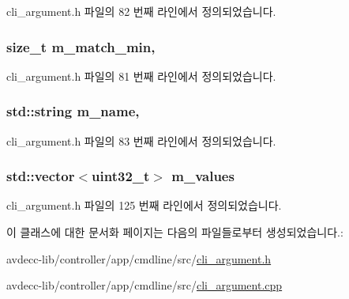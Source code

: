cli\+\_\+argument.\+h 파일의 82 번째 라인에서 정의되었습니다.

\subsubsection[{\texorpdfstring{m\+\_\+match\+\_\+min}{m_match_min}}]{\setlength{\rightskip}{0pt plus 5cm}size\+\_\+t m\+\_\+match\+\_\+min\hspace{0.3cm}{\ttfamily [protected]}, {\ttfamily [inherited]}}\hypertarget{classcli__argument_a9e9208481670105577821d0a1aee5179}{}\label{classcli__argument_a9e9208481670105577821d0a1aee5179}


cli\+\_\+argument.\+h 파일의 81 번째 라인에서 정의되었습니다.

\subsubsection[{\texorpdfstring{m\+\_\+name}{m_name}}]{\setlength{\rightskip}{0pt plus 5cm}std\+::string m\+\_\+name\hspace{0.3cm}{\ttfamily [protected]}, {\ttfamily [inherited]}}\hypertarget{classcli__argument_adb41893ba19e889e56c559f25fc1a68a}{}\label{classcli__argument_adb41893ba19e889e56c559f25fc1a68a}


cli\+\_\+argument.\+h 파일의 83 번째 라인에서 정의되었습니다.

\subsubsection[{\texorpdfstring{m\+\_\+values}{m_values}}]{\setlength{\rightskip}{0pt plus 5cm}std\+::vector$<${\bf uint32\+\_\+t}$>$ m\+\_\+values\hspace{0.3cm}{\ttfamily [private]}}\hypertarget{classcli__argument__end__station_a23a8c507271a1b46c533813cba22c9dc}{}\label{classcli__argument__end__station_a23a8c507271a1b46c533813cba22c9dc}


cli\+\_\+argument.\+h 파일의 125 번째 라인에서 정의되었습니다.



이 클래스에 대한 문서화 페이지는 다음의 파일들로부터 생성되었습니다.\+:\begin{DoxyCompactItemize}
\item 
avdecc-\/lib/controller/app/cmdline/src/\hyperlink{cli__argument_8h}{cli\+\_\+argument.\+h}\item 
avdecc-\/lib/controller/app/cmdline/src/\hyperlink{cli__argument_8cpp}{cli\+\_\+argument.\+cpp}\end{DoxyCompactItemize}
